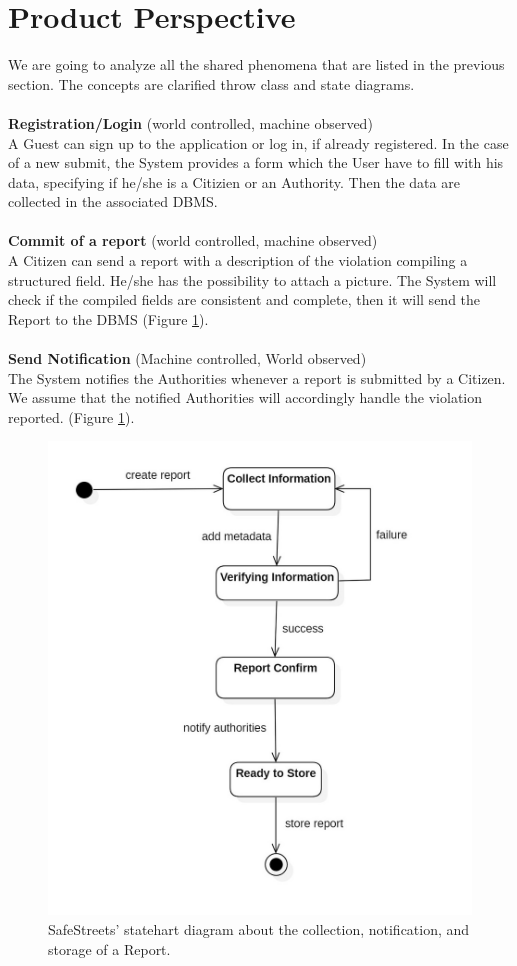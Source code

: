 \documentclass{report}
\begin{document}
\section{Product Perspective}
We are going to analyze all the shared phenomena that are listed in the previous section. The concepts are clarified throw class and state diagrams.\\
\\
\textbf{Registration/Login} (world controlled, machine observed)\\
A Guest can sign up to the application or log in, if already registered. 
In the case of a new submit, the System provides a form which the User have to fill with his data, specifying if he/she is 
a Citizien or an Authority. Then the data are collected in the associated DBMS.\\
\\ 
\textbf{Commit of a report} (world controlled, machine observed)\\
A Citizen can send a report with a description of the violation compiling a structured field. He/she has the possibility to  attach a picture. The System will check if the compiled fields are consistent and complete, then it will send the Report to the DBMS (Figure \ref{fig:State1}). \\
\\
\textbf{Send Notification} (Machine controlled, World observed)\\
The System notifies the Authorities whenever a report is submitted by a Citizen. 
We assume that the notified Authorities will accordingly handle the violation reported. (Figure \ref{fig:State1}).
\begin{figure}[!ht]
\begin{center}
\includegraphics[width=.8\textwidth]{./img/img_Report.jpg}
\end{center}
\caption{SafeStreets' statehart diagram about the collection, notification, and storage of a Report.}
\label{fig:State1}
\end{figure} 
\end{document}

